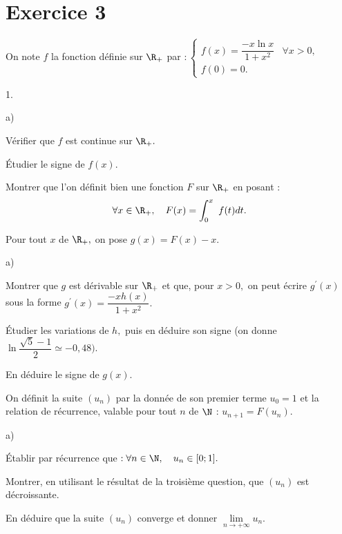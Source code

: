 \documentclass[11pt]{article}%
\begin{document}
\section*{Exercice 3}

On note $f$ la fonction définie sur $\R_{+}$ par $ :\left\{ 
\begin{array}{ll}
f(x) = \dfrac{-x\ln x}{1 + x^{2}} & \forall x>0, \\
f(0) = 0. & 
\end{array}
\right. $

\begin{noliste}{1.}
 \setlength{\itemsep}{4mm}
\item 

\begin{noliste}{a)}
 \setlength{\itemsep}{2mm}
\item Vérifier que $f$ est continue sur $\R_{+}.$

\item Étudier le signe de $f(x).$
\end{noliste}

\item Montrer que l'on définit bien une fonction $F$ sur $\R_{+}$ en
posant :
\[
\forall x\in \R_{+},\quad F(x) = \dint{0}{x}f(t)dt.
\]

\item Pour tout $x$ de $\R_{+},$ on pose $g(x) = F(x)-x.$

\begin{noliste}{a)}
 \setlength{\itemsep}{2mm}
\item Montrer que $g$ est dérivable sur $\R_{+}$ et que, pour $x>0,$
on peut écrire $g^{\prime }(x)$ sous la forme $g^{\prime }(x) =
\dfrac{-xh(x)}{1 + x^{2}}.$

\item Étudier les variations de $h,$ puis en déduire son signe (on
donne $\ln \dfrac{\sqrt{5}-1}{2}\simeq -0,48).$

\item En déduire le signe de $g(x).$
\end{noliste}

\item On définit la suite $(u_{n})$ par la donnée de son premier terme
$u_{0} = 1$ et la relation de récurrence, valable pour tout $n$ de $\N$
: $u_{n + 1} = F(u_{n}).$

\begin{noliste}{a)}
 \setlength{\itemsep}{2mm}
\item Établir par récurrence que $ :\forall n\in \N,\quad u_{n}\in
\lbrack 0;1].$

\item Montrer, en utilisant le résultat de la troisième question, que
$(u_{n})$ est décroissante.

\item En déduire que la suite $(u_{n})$ converge et donner
$\underset{n\rightarrow + \infty }{\lim }u_{n}.$
\end{noliste}
\end{noliste}
\end{document}
